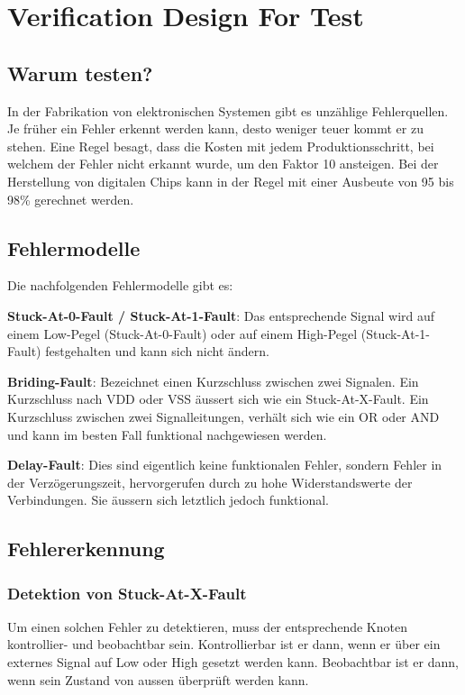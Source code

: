 \section{Verification Design For Test}
\subsection{Warum testen?}
In der Fabrikation von elektronischen Systemen gibt es unzählige Fehlerquellen. Je früher ein Fehler erkennt werden kann, desto weniger teuer kommt er zu stehen. Eine Regel besagt, dass die Kosten mit jedem Produktionsschritt, bei welchem der Fehler nicht erkannt wurde, um den Faktor 10 ansteigen. Bei der Herstellung von digitalen Chips kann in der Regel mit einer Ausbeute von 95 bis 98\% gerechnet werden.

\subsection{Fehlermodelle}
Die nachfolgenden Fehlermodelle gibt es:
\begin{compactitem}
    \item \textbf{Stuck-At-0-Fault / Stuck-At-1-Fault}: Das entsprechende Signal wird auf einem Low-Pegel (Stuck-At-0-Fault) oder auf einem High-Pegel (Stuck-At-1-Fault) festgehalten und kann sich nicht ändern.
    \item \textbf{Briding-Fault}: Bezeichnet einen Kurzschluss zwischen zwei Signalen. Ein Kurzschluss nach VDD oder VSS äussert sich wie ein Stuck-At-X-Fault. Ein Kurzschluss zwischen zwei Signalleitungen, verhält sich wie ein OR oder AND und kann im besten Fall funktional nachgewiesen werden.
    \item \textbf{Delay-Fault}: Dies sind eigentlich keine funktionalen Fehler, sondern Fehler in der Verzögerungszeit, hervorgerufen durch zu hohe Widerstandswerte der Verbindungen. Sie äussern sich letztlich jedoch funktional.
\end{compactitem}

\subsection{Fehlererkennung}
\subsubsection{Detektion von Stuck-At-X-Fault}
Um einen solchen Fehler zu detektieren, muss der entsprechende Knoten kontrollier- und beobachtbar sein. Kontrollierbar ist er dann, wenn er über ein externes Signal auf Low oder High gesetzt werden kann. Beobachtbar ist er dann, wenn sein Zustand von aussen überprüft werden kann.
